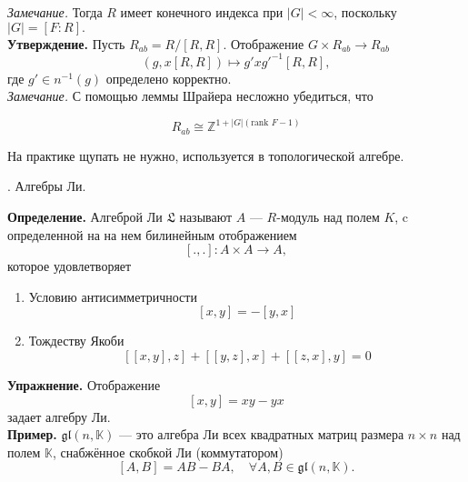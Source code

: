 \documentclass[
 aps, pra,
 amsmath,amssymb,
 11pt,
 final,
tightenlines,
 twoside,
 twocolumn,
 nofloats,
nofootinbib,
 superscriptaddress,
showkeys,
showkeywords,
 ]
{revtex4-2}
\begin{document}
{{ \it Замечание. } Тогда $R$ имеет конечного индекса при $|G| < \infty$, поскольку $|G| = [F : R].$ \\

{ \bf Утверждение.} Пусть $R_{ab} = R/[R, R]$. Отображение $G \times R_{ab} \to R_{ab}$
$$
(g, x[R, R]) \mapsto g' xg'^{-1}[R, R], 
$$
где $g' \in n^{-1}(g)$ определено корректно.\\





{ \it Замечание.} С помощью леммы Шрайера несложно убедиться, что

\[
R_{ab} \cong \mathbb{Z}^{1 + |G|(\text{rank } F-1)}
\]

На практике щупать не нужно, используется в топологической алгебре.

\hrulefill

\begin{center}
{. Алгебры Ли.}
\end{center}

{ \bf Определение.} Алгеброй Ли ${\displaystyle {\mathfrak {L}}}$ 
 называют $A$ --- $R$-модуль над полем $K$, c определенной на на нем билинейным отображением $$[ ., . ] : A \times A \to A,$$
которое удовлетворяет 
\begin{enumerate}
    \item Условию антисимметричности 
    $$
    [x, y] = - [y, x]
    $$

    \item { Тождеству Якоби } 
    $$
    [[x, y], z] + [[y, z], x] + [[z, x], y] = 0
    $$
\end{enumerate}


{ \bf Упражнение. } Отображение 
$$
[x, y] = xy - yx
$$ 
задает алгебру Ли.\\

{ \bf Пример. } \(\mathfrak{gl}(n, \mathbb{K})\) --- это алгебра Ли всех квадратных матриц размера \(n \times n\) над полем \(\mathbb{K}\), снабжённое скобкой Ли (коммутатором)
\[
[A, B] = AB - BA, \quad \forall A,B \in \mathfrak{gl}(n, \mathbb{K}).
\]


}
\end{document}
